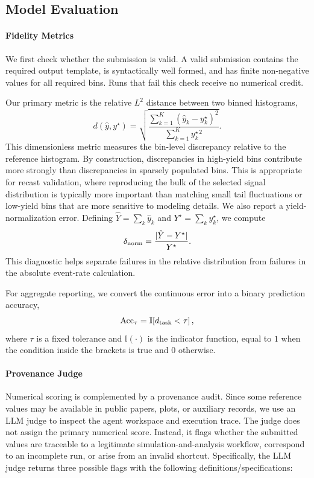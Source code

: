\documentclass{article}
\begin{document}
\subsection{Model Evaluation}
\label{sec:metrics}

\paragraph{Fidelity Metrics}
We first check whether the submission is valid. A valid submission contains the required output template, is syntactically well formed, and has finite non-negative values for all required bins. Runs that fail this check receive no numerical credit.

Our primary metric is the relative \(L^2\) distance between two binned histograms,
\begin{equation}
    d(\hat y,y^\star)
    =
    \sqrt{
    \frac{
    \sum_{k=1}^K
    \left(\hat y_k-y^\star_k\right)^2
    }{
    \sum_{k=1}^K
    y_k^{\star\,2}
    }}
    .
\end{equation}
This dimensionless metric measures the bin-level discrepancy relative to the reference histogram. By construction, discrepancies in high-yield bins contribute more strongly than discrepancies in sparsely populated bins. This is appropriate for recast validation, where reproducing the bulk of the selected signal distribution is typically more important than matching small tail fluctuations or low-yield bins that are more sensitive to modeling details. We also report a yield-normalization error. Defining \(\hat{Y}=\sum_k\hat{y}_k\) and \(Y^\star=\sum_k y^\star_k\), we compute
\begin{equation}
    \delta_{\rm norm}
    =
    \frac{|\hat{Y}-Y^\star|}{Y^\star}.
\end{equation}
This diagnostic helps separate failures in the relative distribution from failures in the absolute event-rate calculation.

For aggregate reporting, we convert the continuous error into a binary prediction accuracy,
\begin{equation}
    \mathrm{Acc}_{\tau}
    =
    \mathbb{I}\!\left[
    d_{\rm task}<\tau
    \right],
\end{equation}
where \(\tau\) is a fixed tolerance and $\mathbb{I}(\cdot)$ is the indicator function, equal to \(1\) when the condition inside the brackets is true and \(0\) otherwise.

\paragraph{Provenance Judge}
Numerical scoring is complemented by a provenance audit. Since some reference values may be available in public papers, plots, or auxiliary records, we use an LLM judge to inspect the agent workspace and execution trace. The judge does not assign the primary numerical score. Instead, it flags whether the submitted values are traceable to a legitimate simulation-and-analysis workflow, correspond to an incomplete run, or arise from an invalid shortcut. Specifically, the LLM judge returns three possible flags with the following definitions/specifications:
\end{document}
